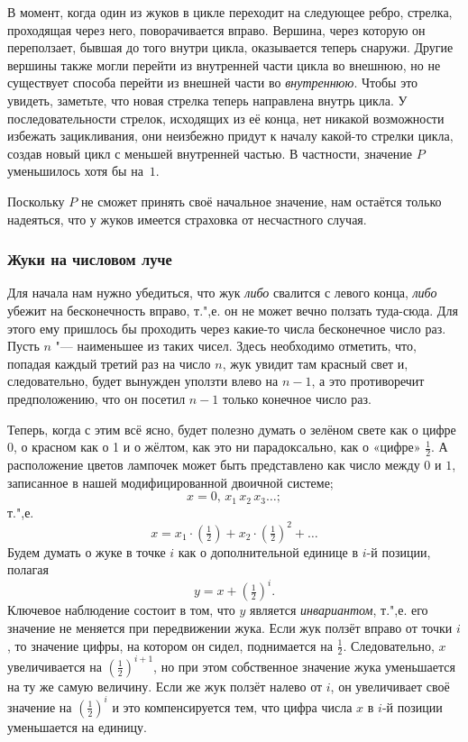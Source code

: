 \documentclass[twoside]{book}
\begin{document}
В момент, когда один из жуков в цикле переходит на следующее ребро, стрелка, проходящая через него, поворачивается вправо.
Вершина, через которую он переползает, бывшая до того внутри цикла, оказывается теперь снаружи.
Другие вершины также могли перейти из внутренней части цикла во внешнюю, но не существует способа перейти из внешней части во \emph{внутреннюю}.
Чтобы это увидеть, заметьте, что новая стрелка теперь направлена внутрь цикла.
У последовательности стрелок, исходящих из её конца, нет никакой возможности избежать зацикливания, они неизбежно придут к началу какой-то стрелки цикла, создав новый цикл с меньшей внутренней частью.
В частности, значение $P$ уменьшилось хотя бы на~$1$.
{\par}

Поскольку $P$ не сможет принять своё начальное значение, нам остаётся только надеяться, что у жуков имеется страховка от несчастного случая.
\heart


\subsubsection*{Жуки на числовом луче}%

Для начала нам нужно убедиться, что жук \emph{либо} свалится с левого конца, \emph{либо} убежит на бесконечность вправо, т.",е. он не может вечно ползать туда-сюда.
Для этого ему пришлось бы проходить через какие-то числа бесконечное число раз.
Пусть $n$ "--- наименьшее из таких чисел.
Здесь необходимо отметить, что, попадая каждый третий раз на число $n$, жук увидит там красный свет и, следовательно, будет вынужден уползти влево на $n-1$, а это противоречит предположению, что он посетил $n-1$ только конечное число раз.

Теперь, когда с этим всё ясно, будет полезно думать о зелёном свете как о цифре 0, о красном как о 1 и о жёлтом, как это ни парадоксально, как о «цифре» $\tfrac12$.
А расположение цветов лампочек может быть представлено как число между $0$ и $1$, записанное в нашей модифицированной двоичной системе;
\[x = 0{,}\,x_1\,x_2\,x_3\dots;\]
т.",е.
 \[x = x_1\cdot(\tfrac12)+x_2\cdot(\tfrac12)^2+\dots\]
Будем думать о жуке в точке $i$ как о дополнительной единице в $i$-й позиции, 
полагая
\[y=x+(\tfrac12)^i.\]
Ключевое наблюдение состоит в том, что $y$ является \emph{инвариантом}, т.",е. его значение не меняется при передвижении жука.
Если жук ползёт вправо от точки $i$, то значение цифры, на котором он сидел, поднимается на $\tfrac12$.
Следовательно, $x$ увеличивается на $(\tfrac12)^{i+1}$, но при этом собственное значение жука уменьшается на ту же самую величину.
Если же жук ползёт налево от $i$, он увеличивает своё значение на $(\tfrac12)^i$ и это компенсируется тем, что цифра числа $x$ в $i$-й позиции уменьшается на единицу.
\end{document}
